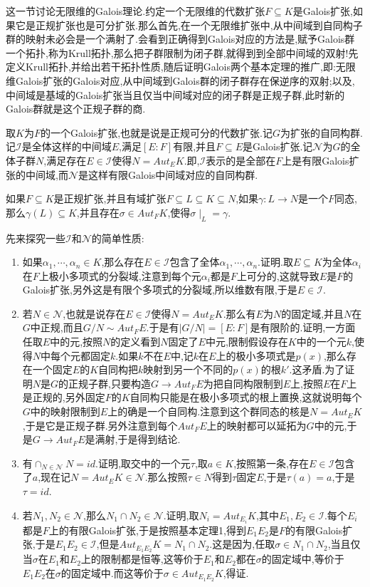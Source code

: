 这一节讨论无限维的Galois理论.约定一个无限维的代数扩张$F\subseteq K$是Galois扩张,如果它是正规扩张也是可分扩张.那么首先,在一个无限维扩张中,从中间域到自同构子群的映射未必会是一个满射了.会看到正确得到Galois对应的方法是,赋予Galois群一个拓扑,称为Krull拓扑,那么把子群限制为闭子群,就得到到全部中间域的双射!先定义Krull拓扑,并给出若干拓扑性质,随后证明Galois两个基本定理的推广,即:无限维Galois扩张的Galois对应,从中间域到Galois群的闭子群存在保逆序的双射;以及,中间域是基域的Galois扩张当且仅当中间域对应的闭子群是正规子群,此时新的Galois群就是这个正规子群的商.

取$K$为$F$的一个Galois扩张,也就是说是正规可分的代数扩张.记$G$为扩张的自同构群.记$\mathscr{I}$是全体这样的中间域$E$,满足$[E:F]$有限,并且$F\subseteq E$是Galois扩张.记$\mathscr{N}$为$G$的全体子群$N$,满足存在$E\in\mathscr{I}$使得$N=Aut_EK$.即,$\mathscr{I}$表示的是全部在$F$上是有限Galois扩张的中间域,而$\mathscr{N}$是这样有限Galois中间域对应的自同构群.

如果$F\subseteq K$是正规扩张,并且有域扩张$F\subseteq L\subseteq K\subseteq N$,如果$\gamma:L\to N$是一个$F$同态,那么$\gamma(L)\subseteq K$,并且存在$\sigma\in Aut_FK$,使得$\sigma\mid_L=\gamma$.

先来探究一些$\mathscr{I}$和$\mathscr{N}$的简单性质:
\begin{enumerate}
	\item 如果$\alpha_1,\cdots,\alpha_n\in K$,那么存在$E\in\mathscr{I}$包含了全体$\alpha_1,\cdots,\alpha_n$.证明.取$E\subseteq K$为全体$\alpha_i$在$F$上极小多项式的分裂域,注意到每个元$\alpha_i$都是$F$上可分的,这就导致$E$是$F$的Galois扩张,另外这是有限个多项式的分裂域,所以维数有限,于是$E\in\mathscr{I}$.
	\item 若$N\in\mathscr{N}$,也就是说存在$E\in\mathscr{I}$使得$N=Aut_EK$.那么有$E$为$N$的固定域,并且$N$在$G$中正规,而且$G/N\sim Aut_FE$.于是有$|G/N|=[E:F]$是有限阶的.证明,一方面任取$E$中的元,按照$N$的定义看到$N$固定了$E$中元,限制假设存在$K$中的一个元$k$,使得$N$中每个元都固定$k$.如果$k$不在$E$中,记$k$在$E$上的极小多项式是$p(x)$,那么存在一个固定$E$的$K$自同构把$k$映射到另一个不同的$p(x)$的根$k'$.这矛盾.为了证明$N$是$G$的正规子群,只要构造$G\to Aut_FE$为把自同构限制到$E$上,按照$E$在$F$上是正规的,另外固定$F$的$K$自同构只能是在极小多项式的根上置换,这就说明每个$G$中的映射限制到$E$上的确是一个自同构.注意到这个群同态的核是$N=Aut_EK$,于是它是正规子群.另外注意到每个$Aut_FE$上的映射都可以延拓为$G$中的元,于是$G\to Aut_FE$是满射,于是得到结论.
	\item 有$\cap_{N\in\mathscr{N}}N={id}$.证明,取交中的一个元$\tau$,取$a\in K$,按照第一条,存在$E\in\mathscr{I}$包含了$a$,现在记$N=Aut_EK\in\mathscr{N}$.那么按照$\tau\in N$得到$\tau$固定$E$,于是$\tau(a)=a$,于是$\tau=id$.
	\item 若$N_1,N_2\in\mathscr{N}$,那么$N_1\cap N_2\in\mathscr{N}$.证明,取$N_i=Aut_{E_i}K$,其中$E_1,E_2\in\mathscr{I}$.每个$E_i$都是$F$上的有限Galois扩张,于是按照基本定理1,得到$E_1E_2$是$F$的有限Galois扩张,于是$E_1E_2\in\mathscr{I}$,但是$Aut_{E_1E_2}K=N_1\cap N_2$.这是因为,任取$\sigma\in N_1\cap N_2$,当且仅当$\sigma$在$E_1$和$E_2$上的限制都是恒等,这等价于$E_1$和$E_2$都在$\sigma$的固定域中,等价于$E_1E_2$在$\sigma$的固定域中.而这等价于$\sigma\in Aut_{E_1E_2}K$,得证.
\end{enumerate}

